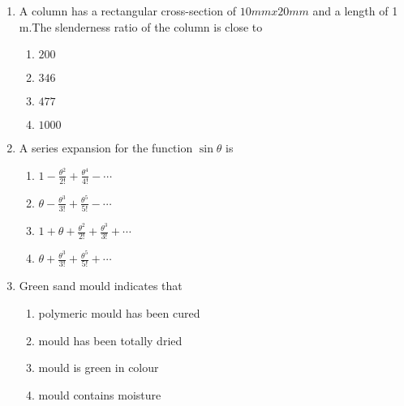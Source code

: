 \documentclass[journal]{IEEEtran}
\begin{document}
\begin{enumerate}
             \item A column has a rectangular cross-section of $10 mmx 20 mm$ and a length of 1 m.The slenderness ratio of the column is close to
                 \begin{multicols}{2}

             \begin{enumerate}
                 \item $200$
                 \item $346$
                 \item $477$
                 \item $1000$

             \end{enumerate}
                 \end{multicols}

             \item A series expansion for the function $\sin \theta$ is
                 \begin{multicols}{2}

             \begin{enumerate}
                 \item $ 1 - \frac{\theta^2}{2!} + \frac{\theta^4}{4!} - \cdots $
                 \item $ \theta - \frac{\theta^3}{3!} + \frac{\theta^5}{5!} - \cdots $
                 \item $ 1 + \theta + \frac{\theta^2}{2!} + \frac{\theta^3}{3!} + \cdots $
                 \item $ \theta + \frac{\theta^3}{3!} + \frac{\theta^5}{5!} + \cdots $

                 
             \end{enumerate}
                 \end{multicols}


\item Green sand mould indicates that         
\begin{multicols}{2}

             \begin{enumerate}
                 \item polymeric mould has been cured
                 \item mould has been totally dried
                 \item mould is green in colour
                 \item mould contains moisture

             \end{enumerate}
                 \end{multicols}


\end{enumerate}
\end{document}
